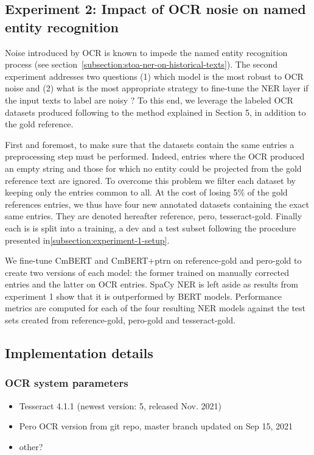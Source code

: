 \subsection{Experiment 2: Impact of OCR nosie on named entity recognition}
\label{subsection:experiment-2-setup}
Noise introduced by OCR is known to impede the named entity recognition process (see section~\ref{subsection:stoa-ner-on-historical-texts}).
The second experiment addresses two questions (1) which model is the most robust to OCR noise and (2) what is the most appropriate strategy to fine-tune the NER layer if the input texts to label are noisy ?
To this end, we leverage the labeled OCR datasets produced following to the method explained in Section 5, in addition to the gold reference.

First and foremost, to make sure that the datasets contain the same entries a preprocessing step must be performed.
Indeed, entries where the OCR produced an empty string and those for which no entity could be projected from the gold reference text are ignored.
To overcome this problem we filter each dataset by keeping only the entries common to all.
At the cost of losing  5\% of the gold references entries, we thus have four new annotated datasets containing the exact same entries.
They are denoted hereafter {reference, pero, tesseract}-gold.
Finally each is is split into a training, a dev and a test subset following the procedure presented in\cref{subsection:experiment-1-setup}.

We fine-tune CmBERT and CmBERT+ptrn on reference-gold and pero-gold to create two versions of each model: the former trained on manually corrected entries and the latter on OCR entries.
SpaCy NER is left aside as results from experiment 1 show that it is outperformed by BERT models.
Performance metrics are computed for each of the four resulting NER models against the test sets created from reference-gold, pero-gold and tesseract-gold.

\subsection{Implementation details}

\subsubsection{OCR system parameters}
\begin{itemize}
    \item Tesseract 4.1.1 (newest version: 5, released Nov. 2021)
    \item Pero OCR version from git repo, master branch updated on Sep 15, 2021 %
    \item other?  %
\end{itemize}

